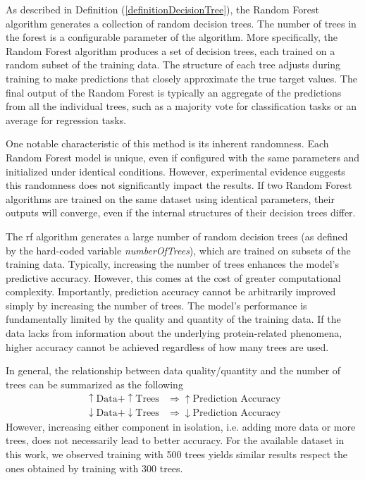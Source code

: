 \documentclass[11pt]{article}
\begin{document}
As described in Definition (\ref{definitionDecisionTree}), the Random Forest algorithm generates a collection of random decision trees. The number of trees in the forest is a configurable parameter of the algorithm. More specifically, the Random Forest algorithm produces a set of decision trees, each trained on a random subset of the training data. The structure of each tree adjusts during training to make predictions that closely approximate the true target values. The final output of the Random Forest is typically an aggregate of the predictions from all the individual trees, such as a majority vote for classification tasks or an average for regression tasks. \par

One notable characteristic of this method is its inherent randomness. Each Random Forest model is unique, even if configured with the same parameters and initialized under identical conditions. However, experimental evidence suggests this randomness does not significantly impact the results. If two Random Forest algorithms are trained on the same dataset using identical parameters, their outputs will converge, even if the internal structures of their decision trees differ.

The \gls{rf} algorithm generates a large number of random decision trees (as defined by the hard-coded variable \emph{numberOfTrees}), which are trained on subsets of the training data. Typically, increasing the number of trees enhances the model’s predictive accuracy. However, this comes at the cost of greater computational complexity. Importantly, prediction accuracy cannot be arbitrarily improved simply by increasing the number of trees. The model’s performance is fundamentally limited by the quality and quantity of the training data. If the data lacks from information about the underlying protein-related phenomena, higher accuracy cannot be achieved regardless of how many trees are used.

In general, the relationship between data quality/quantity and the number of trees can be summarized as the following
\begin{align*}
\uparrow\text{Data} + \uparrow\text{Trees} &\Rightarrow \uparrow\text{Prediction Accuracy} \\
\downarrow\text{Data} + \downarrow\text{Trees} &\Rightarrow \downarrow\text{Prediction Accuracy}
\end{align*}
However, increasing either component in isolation, i.e. adding more data or more trees, does not necessarily lead to better accuracy. For the available dataset in this work, we observed training with 500 trees yields similar results respect the ones obtained by training with 300 trees.
\end{document}
